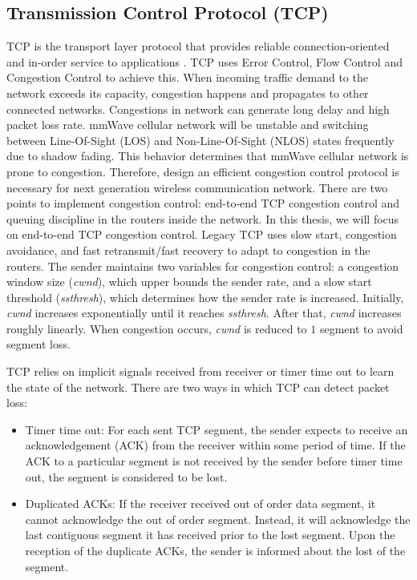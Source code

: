 \subsection{Transmission Control Protocol (TCP)}
\par TCP is the transport layer protocol that provides reliable connection-oriented and in-order service to applications \cite{panwar2004tcp}. TCP uses Error Control, Flow Control and Congestion Control to achieve this. When incoming traffic demand to the network exceeds its capacity, congestion happens and propagates to other connected networks. Congestions in network can generate long delay and high packet loss rate. mmWave cellular network will be unstable and switching between Line-Of-Sight (LOS) and Non-Line-Of-Sight (NLOS) states frequently due to shadow fading. This behavior determines that mmWave cellular network is prone to congestion. Therefore, design an efficient congestion control protocol is necessary for next generation wireless communication network. There are two points to implement congestion control: end-to-end TCP congestion control and queuing discipline in the routers inside the network. In this thesis, we will focus on end-to-end TCP congestion control. Legacy TCP uses slow start, congestion avoidance, and fast retransmit/fast recovery to adapt to congestion in the routers. The sender maintains two variables for congestion control: a congestion window size (\emph{cwnd}), which upper bounds the sender rate, and a slow start threshold (\emph{ssthresh}), which determines how the sender rate is increased. Initially, \emph{cwnd} increases exponentially until it reaches \emph{ssthresh}. After that, \emph{cwnd} increases roughly linearly. When congestion occurs, \emph{cwnd} is reduced to $1$ segment to avoid segment loss.
\par TCP relies on implicit signals received from receiver or timer time out to learn the state of the network. There are two ways in which TCP can detect packet loss: 
\begin{itemize}
\item Timer time out: For each sent TCP segment, the sender expects to receive an acknowledgement (ACK) from the receiver within some period of time. If the ACK to a particular segment is not received by the sender before timer time out, the segment is considered to be lost. 
\item Duplicated ACKs: If the receiver received out of order data segment, it cannot acknowledge the out of order segment. Instead, it will acknowledge the last contiguous segment it has received prior to the lost segment. Upon the reception of the duplicate ACKs, the sender is informed about the lost of the segment.
\end{itemize}
